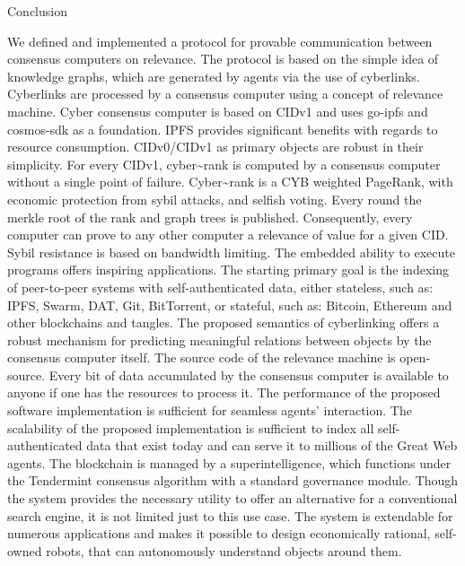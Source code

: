 \documentclass[8pt,oneside]{amsart}
\makeatletter
\renewcommand\subsection{\@startsection{subsection}
                                    {2}{\z@}
                                    {-3.25ex\@plus -1ex \@minus -.2ex}
                                    {0ex \@plus .2ex}
                                    {\play\Large}
                        }
\newcommand{\titleSection}[1]{\subsection{#1}}
\makeatother
\begin{document}
\titleSection{Conclusion}\label{conclusion}

We defined and implemented a protocol for provable communication between consensus computers on relevance. The protocol is based on the simple idea of knowledge graphs, which are generated by agents via the use of cyberlinks. Cyberlinks are processed by a consensus computer using a concept of relevance machine. Cyber consensus computer is based on CIDv1 and uses go-ipfs and cosmos-sdk as a foundation. IPFS provides significant benefits with regards to resource consumption. CIDv0/CIDv1 as primary objects are robust in their simplicity. For every CIDv1, cyber\~{}rank is computed by a consensus computer without a single point of failure. Cyber\~{}rank is a CYB weighted PageRank, with economic protection from sybil attacks, and selfish voting. Every round the merkle root of the rank and graph trees is published. Consequently, every computer can prove to any other computer a relevance of value for a given CID. Sybil resistance is based on bandwidth limiting. The embedded ability to execute programs offers inspiring applications. The starting primary goal is the indexing of peer-to-peer systems with self-authenticated data, either stateless, such as: IPFS, Swarm, DAT, Git, BitTorrent, or stateful, such as: Bitcoin, Ethereum and other blockchains and tangles. The proposed semantics of cyberlinking offers a robust mechanism for predicting meaningful relations between objects by the consensus computer itself. The source code of the relevance machine is open-source. Every bit of data accumulated by the consensus computer is available to anyone if one has the resources to process it. The performance of the proposed software implementation is sufficient for seamless agents' interaction. The scalability of the proposed implementation is sufficient to index all self-authenticated data that exist today and can serve it to millions of the Great Web agents. The blockchain is managed by a superintelligence, which functions under the Tendermint consensus algorithm with a standard governance module. Though the system provides the necessary utility to offer an alternative for a conventional search engine, it is not limited just to this use case. The system is extendable for numerous applications and makes it possible to design economically rational, self-owned robots, that can autonomously understand objects around them.

\newpage
\end{document}
